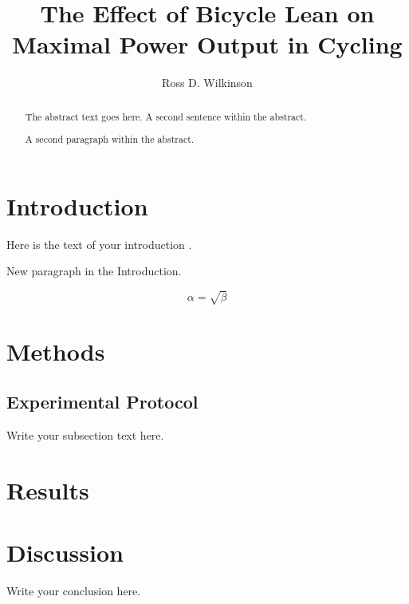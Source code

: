 \documentclass{article}
\begin{document}
\title{The Effect of Bicycle Lean on Maximal Power Output in Cycling}
\author{Ross D. Wilkinson}

\maketitle

\begin{abstract}
The abstract text goes here. 
A second sentence within the abstract. 

A second paragraph within the abstract.
\end{abstract}

\section{Introduction}
Here is the text of your introduction \cite{Hull1990,Soden1979}.

New paragraph in the Introduction.

\begin{equation}
    \label{simple_equation}
    \alpha = \sqrt{ \beta }
\end{equation}

\section{Methods}

\subsection{Experimental Protocol}
Write your subsection text here.

\section{Results}


\section{Discussion}
Write your conclusion here.



\end{document}
